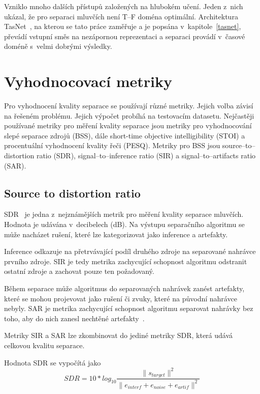 Vzniklo mnoho dalších přístupů založených na hlubokém učení. Jeden z~nich ukázal, že pro separaci mluvčích není T--F doména optimální. Architektura TasNet~\cite{luo2018convtasnet}, na kterou se tato práce zaměřuje a je popsána v~kapitole~\ref{tasnet}, převádí vstupní směs na nezápornou reprezentaci a separaci provádí v~časové doméně s~velmi dobrými výsledky.



\section{Vyhodnocovací metriky}
Pro vyhodnocení kvality separace se používají různé metriky. Jejich volba závisí na řešeném problému. Jejich výpočet probíhá na testovacím datasetu. Nejčastěji používané metriky pro měření kvality separace jsou metriky pro vyhodnocování slepé separace zdrojů (BSS), dále short-time objective intelligibility (STOI) a procentuální vyhodnocení kvality řeči (PESQ). Metriky pro BSS jsou source--to--distortion ratio (SDR), signal--to--inference ratio (SIR) a signal--to--artifacts ratio (SAR).


\subsection{Source to distortion ratio}
SDR~\cite{vincent-inria-00544230} je jedna z~nejznámějších metrik pro měření kvality separace mluvčích. Hodnota je udávána v~decibelech (dB). Na výstupu separačního algoritmu se může nacházet rušení, které lze kategorizovat jako inference a artefakty. 

Inference odkazuje na přetrvávající podíl druhého zdroje na separované nahrávce prvního zdroje. SIR je tedy metrika zachycující schopnost algoritmu odstranit ostatní zdroje a zachovat pouze ten požadovaný.

Během separace může algoritmus do separovaných nahrávek zanést artefakty, které se mohou projevovat jako rušení či zvuky, které na původní nahrávce nebyly. SAR je metrika zachycující schopnost algoritmu separovat nahrávky bez toho, aby do nich zanesl nechtěné artefakty~\cite{venkataramani2018performance}.

Metriky SIR a SAR lze zkombinovat do jediné metriky SDR, která udává celkovou kvalitu separace. 

Hodnota SDR se vypočítá jako 
\begin{equation}
  SDR = 10*log_{10}\frac{\|s_{target}\|^2}{\|e_{interf} + e_{noise} + e_{artif}\|^2}
\end{equation}

